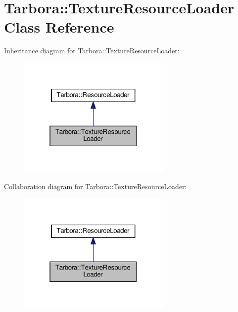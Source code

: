 \hypertarget{classTarbora_1_1TextureResourceLoader}{}\section{Tarbora\+:\+:Texture\+Resource\+Loader Class Reference}
\label{classTarbora_1_1TextureResourceLoader}


Inheritance diagram for Tarbora\+:\+:Texture\+Resource\+Loader\+:\nopagebreak
\begin{figure}[H]
\begin{center}
\leavevmode
\includegraphics[width=211pt]{classTarbora_1_1TextureResourceLoader__inherit__graph}
\end{center}
\end{figure}


Collaboration diagram for Tarbora\+:\+:Texture\+Resource\+Loader\+:\nopagebreak
\begin{figure}[H]
\begin{center}
\leavevmode
\includegraphics[width=211pt]{classTarbora_1_1TextureResourceLoader__coll__graph}
\end{center}
\end{figure}
